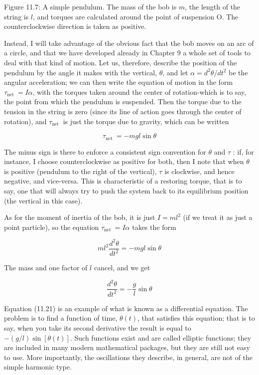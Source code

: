 \documentclass[10pt]{article}
\begin{document}
Figure 11.7: A simple pendulum. The mass of the bob is $m$, the length of the string is $l$, and torques are calculated around the point of suspension O. The counterclockwise direction is taken as positive.

Instead, I will take advantage of the obvious fact that the bob moves on an arc of a circle, and that we have developed already in Chapter 9 a whole set of tools to deal with that kind of motion. Let us, therefore, describe the position of the pendulum by the angle it makes with the vertical, $\theta$, and let $\alpha=d^{2} \theta / d t^{2}$ be the angular acceleration; we can then write the equation of motion in the form $\tau_{\text {net }}=I \alpha$, with the torques taken around the center of rotation-which is to say, the point from which the pendulum is suspended. Then the torque due to the tension in the string is zero (since its line of action goes through the center of rotation), and $\tau_{\text {net }}$ is just the torque due to gravity, which can be written


\begin{equation*}
\tau_{\text {net }}=-m g l \sin \theta \tag{11.19}
\end{equation*}


The minus sign is there to enforce a consistent sign convention for $\theta$ and $\tau$ : if, for instance, I choose counterclockwise as positive for both, then I note that when $\theta$ is positive (pendulum to the right of the vertical), $\tau$ is clockwise, and hence negative, and vice-versa. This is characteristic of a restoring torque, that is to say, one that will always try to push the system back to its equilibrium position (the vertical in this case).

As for the moment of inertia of the bob, it is just $I=m l^{2}$ (if we treat it as just a point particle), so the equation $\tau_{\text {net }}=I \alpha$ takes the form


\begin{equation*}
m l^{2} \frac{d^{2} \theta}{d t^{2}}=-m g l \sin \theta \tag{11.20}
\end{equation*}


The mass and one factor of $l$ cancel, and we get


\begin{equation*}
\frac{d^{2} \theta}{d t^{2}}=-\frac{g}{l} \sin \theta \tag{11.21}
\end{equation*}


Equation (11.21) is an example of what is known as a differential equation. The problem is to find a function of time, $\theta(t)$, that satisfies this equation; that is to say, when you take its second derivative the result is equal to $-(g / l) \sin [\theta(t)]$. Such functions exist and are called elliptic functions; they are included in many modern mathematical packages, but they are still not easy to use. More importantly, the oscillations they describe, in general, are not of the simple harmonic type.
\end{document}
